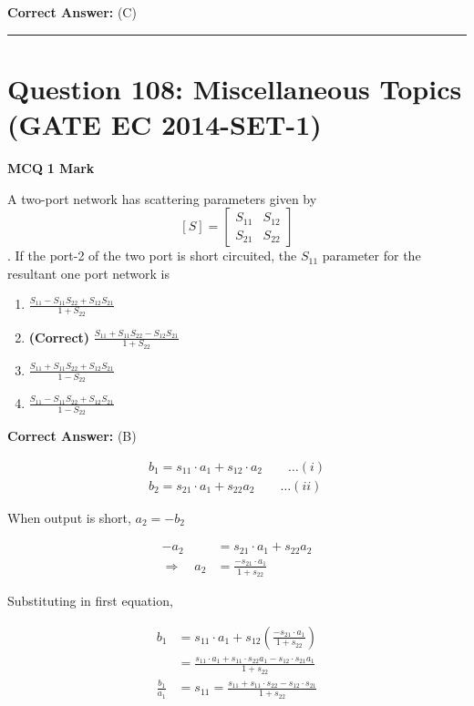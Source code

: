 \documentclass[11pt,a4paper]{article}
\begin{document}
\noindent \textbf{Correct Answer:} (C)


\vspace{1.5em}
\hrule
\vspace{1.5em}

\section*{Question 108: Miscellaneous Topics (GATE EC 2014-SET-1)}
\noindent \textbf{\color{primary}MCQ} \hfill \textbf{\color{secondary}1 Mark}


\noindent A two-port network has scattering parameters given by 
\[
[S]=\begin{bmatrix} S_{11} &S_{12} \\ S_{21} & S_{22} \end{bmatrix}
\]
.  If the
port-2 of the two port is short circuited, the $S_{11}$
parameter for the resultant one port network is


\begin{enumerate}[label=(\Alph*)]
    \item $\frac{S_{11}-S_{11}S_{22}+S_{12}S_{21}}{1+S_{22}}$
    \item \textbf{(Correct)} $\frac{S_{11}+S_{11}S_{22}-S_{12}S_{21}}{1+S_{22}}$
    \item $\frac{S_{11}+S_{11}S_{22}+S_{12}S_{21}}{1-S_{22}}$
    \item $\frac{S_{11}-S_{11}S_{22}+S_{12}S_{21}}{1-S_{22}}$
\end{enumerate}

\noindent \textbf{Correct Answer:} (B)

\begin{tcolorbox}[solbox, title=Detailed Solution -- Question 108]
\[
\begin{array}{l} b_{1}=s_{11} \cdot a_{1}+s_{12} \cdot a_{2} \qquad\ldots(i)\\ b_{2}=s_{21} \cdot a_{1}+s_{22} a_{2}\qquad\ldots(ii) \end{array}
\]

 When output is short, $a_{2}=-b_{2}$

\[
\begin{aligned} -a_{2} &=s_{21} \cdot a_{1}+s_{22} a_{2} \\ \Rightarrow \quad a_{2} &=\frac{-s_{21} \cdot a_{1}}{1+s_{22}} \end{aligned}
\]

 Substituting in first equation,

\[
\begin{aligned} b_{1} &=s_{11} \cdot a_{1}+s_{12}\left(\frac{-s_{21} \cdot a_{1}}{1+s_{22}}\right) \\ &=\frac{s_{11} \cdot a_{1}+s_{11} \cdot s_{22} a_{1}-s_{12} \cdot s_{21} a_{1}}{1+s_{22}} \\ \frac{b_{1}}{a_{1}} &=s_{11}=\frac{s_{11}+s_{11} \cdot s_{22}-s_{12} \cdot s_{21}}{1+s_{22}} \end{aligned}
\]
\end{tcolorbox}
\end{document}
